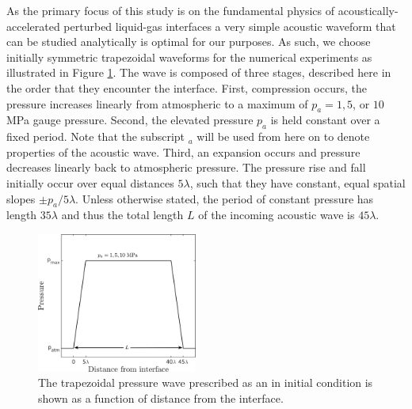 As the primary focus of this study is on the fundamental physics of
acoustically-accelerated perturbed liquid-gas interfaces a very simple
acoustic waveform that can be studied analytically is optimal for our
purposes. As such, we choose initially symmetric trapezoidal waveforms
for the numerical experiments as illustrated in Figure
\ref{fig:p0}. The wave is composed of three stages, described here in
the order that they encounter the interface. First, compression
occurs, the pressure increases linearly from atmospheric to a maximum
of $p_a=1, 5$, or $10$ MPa gauge pressure. Second, the elevated
pressure $p_a$ is held constant over a fixed period. Note
that the subscript $_a$ will be used from here on to denote properties
of the acoustic wave. Third, an expansion occurs and pressure
decreases linearly back to atmospheric pressure. The pressure rise and
fall initially occur over equal distances $5\lambda$, such that they
have constant, equal spatial slopes $\pm p_{a}/5\lambda$. Unless
otherwise stated, the period of constant pressure has length
$35\lambda$ and thus the total length $L$ of the incoming acoustic wave is
$45\lambda$.
% 
\begin{figure}%
  \centering%
  \includegraphics[width=0.47\textwidth]{./figs/lung_figs/p0_vs_y_labeled}%
  \caption[Trapezoidal wave]{The trapezoidal pressure wave prescribed
    as an in initial condition is shown as a function of distance from
    the interface.}%
  \label{fig:p0}
\end{figure}
% 
